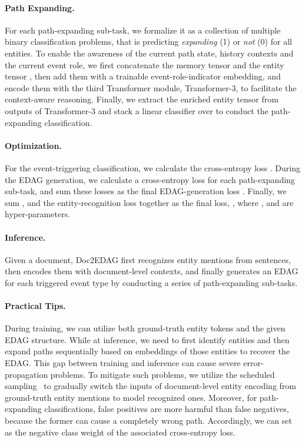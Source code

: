 \documentclass[11pt,a4paper]{article}
\begin{document}
\paragraph{Path Expanding.}
For each path-expanding sub-task, we formalize it as a collection of multiple binary classification problems, that is predicting \textit{expanding} (1) or \textit{not} (0) for all entities.
To enable the awareness of the current path state, history contexts and the current event role,
we first concatenate the memory tensor  and the entity tensor ,
then add them with a trainable event-role-indicator embedding,
and encode them with the third Transformer module, Transformer-3, to facilitate the context-aware reasoning.
Finally, we extract the enriched entity tensor  from outputs of Transformer-3 and stack a linear classifier over  to conduct the path-expanding classification.

\paragraph{Optimization.}
For the event-triggering classification, we calculate the cross-entropy loss .
During the EDAG generation, we calculate a cross-entropy loss for each path-expanding sub-task, and sum these losses as the final EDAG-generation loss .
Finally, we sum ,  and the entity-recognition loss  together as the final loss, , where ,  and  are hyper-parameters.

\paragraph{Inference.}
Given a document, Doc2EDAG first recognizes entity mentions from sentences, 
then encodes them with document-level contexts, 
and finally generates an EDAG for each triggered event type by conducting a series of path-expanding sub-tasks.

\paragraph{Practical Tips.}
During training, we can utilize both ground-truth entity tokens and the given EDAG structure.
While at inference, we need to first identify entities and then expand paths sequentially based on embeddings of those entities to recover the EDAG.
This gap between training and inference can cause severe error-propagation problems.
To mitigate such problems, we utilize the scheduled sampling~\cite{bengio2015scheduled} to gradually switch the inputs of document-level entity encoding from ground-truth entity mentions to model recognized ones.
Moreover, for path-expanding classifications, false positives are more harmful than false negatives, because the former can cause a completely wrong path. Accordingly, we can set  as the negative class weight of the associated cross-entropy loss.
\end{document}
